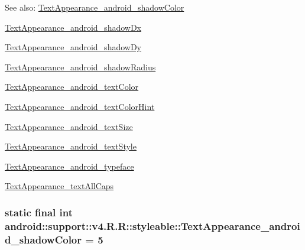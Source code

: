 \begin{Desc}
\item[See also:]\hyperlink{classandroid_1_1support_1_1v4_1_1_r_1_1styleable_18256235d0d912eac257e48967b04d1e}{TextAppearance\_\-android\_\-shadowColor} 

\hyperlink{classandroid_1_1support_1_1v4_1_1_r_1_1styleable_caca2f26badd9c92b5b0111fb4411167}{TextAppearance\_\-android\_\-shadowDx} 

\hyperlink{classandroid_1_1support_1_1v4_1_1_r_1_1styleable_df8c466194468431db1ca727606ba7db}{TextAppearance\_\-android\_\-shadowDy} 

\hyperlink{classandroid_1_1support_1_1v4_1_1_r_1_1styleable_843e7e567e8b26d9c44db983122edc52}{TextAppearance\_\-android\_\-shadowRadius} 

\hyperlink{classandroid_1_1support_1_1v4_1_1_r_1_1styleable_0763260e2c7644b0c1ff2a7c911c03af}{TextAppearance\_\-android\_\-textColor} 

\hyperlink{classandroid_1_1support_1_1v4_1_1_r_1_1styleable_13b2c5daf5c13f138a2f6590d38a3f8c}{TextAppearance\_\-android\_\-textColorHint} 

\hyperlink{classandroid_1_1support_1_1v4_1_1_r_1_1styleable_0ef17f89c7c229543a6ba3224cc45bde}{TextAppearance\_\-android\_\-textSize} 

\hyperlink{classandroid_1_1support_1_1v4_1_1_r_1_1styleable_0613c7992a55173fc1d4760327545d8a}{TextAppearance\_\-android\_\-textStyle} 

\hyperlink{classandroid_1_1support_1_1v4_1_1_r_1_1styleable_6c3c73a9cbb806db9a963cfd57cf2040}{TextAppearance\_\-android\_\-typeface} 

\hyperlink{classandroid_1_1support_1_1v4_1_1_r_1_1styleable_d6fbed48414bfa4d49f846b006cb67af}{TextAppearance\_\-textAllCaps} \end{Desc}
\hypertarget{classandroid_1_1support_1_1v4_1_1_r_1_1styleable_18256235d0d912eac257e48967b04d1e}{
\subsubsection[{TextAppearance\_\-android\_\-shadowColor}]{\setlength{\rightskip}{0pt plus 5cm}static final int android::support::v4.R.R::styleable::TextAppearance\_\-android\_\-shadowColor = 5}}
\label{classandroid_1_1support_1_1v4_1_1_r_1_1styleable_18256235d0d912eac257e48967b04d1e}


